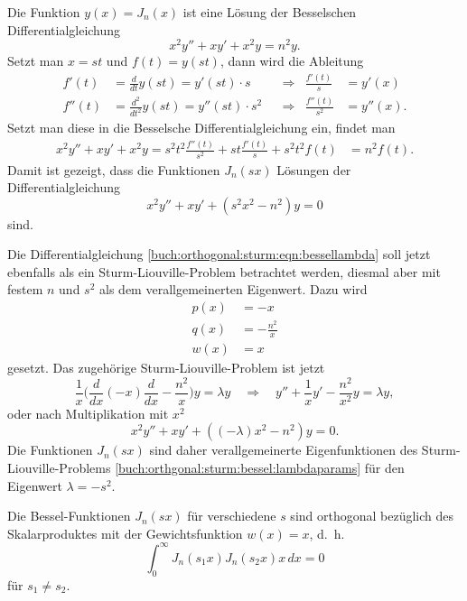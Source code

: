 Die Funktion $y(x) = J_n(x)$ ist eine Lösung der Besselschen
Differentialgleichung
%
%
\[
x^2y'' + xy' + x^2y = n^2y.
\]
Setzt man $x=s t$ und $f(t)=y(s t)$, dann wird die Ableitung 
\[
\begin{aligned}
f'(t)
&=
\frac{d}{dt}y(s t)
=
y'(s t) \cdot s
&&\Rightarrow
&
\frac{f'(t)}{s}
&=
y'(x)
\\
f''(t)
&=
\frac{d^2}{dt^2} y(s t)
=
y''(s t) \cdot s^2
&&\Rightarrow
&
\frac{f''(t)}{s^2}
&=
y''(x).
\end{aligned}
\]
Setzt man diese in die Besselsche Differentialgleichung ein,
findet man
\begin{align*}
x^2y''+xy'+x^2y
=
s^2 t^2 \frac{f''(t)}{s^2}
+
s t \frac{f'(t)}{s}
+
s^2 t^2 f(t)
&=
n^2 f(t).
\end{align*}
Damit ist gezeigt, dass die Funktionen $J_n(s x)$ Lösungen
der Differentialgleichung
\begin{equation}
x^2y'' + xy' + (s^2 x^2  - n^2) y = 0
\label{buch:orthogonal:sturm:eqn:bessellambda}
\end{equation}
sind.

Die Differentialgleichung
\eqref{buch:orthogonal:sturm:eqn:bessellambda}
soll jetzt ebenfalls als ein Sturm-Liouville-Problem betrachtet
werden, diesmal aber mit festem $n$ und $s^2$ als dem verallgemeinerten
Eigenwert.
Dazu wird
\begin{equation}
\begin{aligned}
p(x) &= -x \\
q(x) &= -\frac{n^2}{x} \\
w(x) &= x
\end{aligned}
\label{buch:orthgonal:sturm:bessel:lambdaparams}
\end{equation}
gesetzt.
Das zugehörige Sturm-Liouville-Problem ist jetzt
\[
\frac{1}{x}\biggl(
\frac{d}{dx} (-x)\frac{d}{dx} -\frac{n^2}{x}
\biggr)
y
=
\lambda y
\quad\Rightarrow\quad
y'' + \frac{1}{x}y' - \frac{n^2}{x^2}y = \lambda y,
\]
oder nach Multiplikation mit $x^2$
\begin{equation}
x^2y'' + xy' + ((-\lambda)x^2 - n^2) y = 0.
\end{equation}
Die Funktionen $J_n(sx)$ sind daher verallgemeinerte Eigenfunktionen
des Sturm-Liouville-Problems
\eqref{buch:orthgonal:sturm:bessel:lambdaparams}
für den Eigenwert $\lambda = -s^2$.

\begin{satz}
%
Die Bessel-Funktionen $J_n(sx)$ für verschiedene $s$ sind orthogonal
bezüglich des Skalarproduktes mit der Gewichtsfunktion $w(x)=x$,
d.~h.
\[
\int_0^\infty J_n(s_1x) J_n(s_2x) x\,dx
=
0
\]
für $s_1\ne s_2$.
\end{satz}

